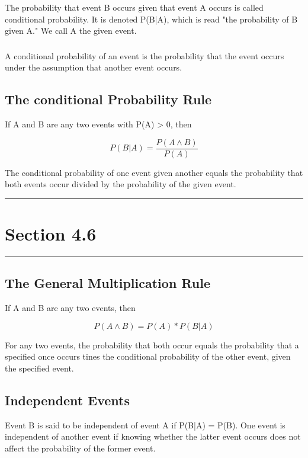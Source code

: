 \documentclass[12pt]{article}
\begin{document}
            \subsubsection*{}
                The probability that event B occurs given that event A occurs is called conditional 
                probability. It is denoted P(B|A),
                which is read "the probability of B given A." We call A the given event.
            \subsubsection*{}
                A conditional probability of an event is the probability that the event occurs under
                the assumption that another event occurs.
        \subsection*{The conditional Probability Rule}
            If A and B are any two events with P(A) > 0, then
            \begin{center}
                \[
                P(B|A) = \frac{P(A \wedge B)}{P(A)}
                \]
            \end{center}
            The conditional probability of one event given another equals the probability that both 
            events occur divided by the probability of the given event.
            
    \noindent\rule{\textwidth}{0.4pt}
    \section*{Section 4.6}
    \noindent\rule{\textwidth}{0.4pt}
        \subsection*{The General Multiplication Rule}
            If A and B are any two events, then 
            \begin{center}
                \[
                    P(A \wedge B) = P(A) * P(B|A)
                \]
            \end{center}
            For any two events, the probability that both occur equals the probability that a specified
            once occurs tines the conditional probability of the other event, given the specified event.         
        \subsection*{Independent Events}
            Event B is said to be independent of event A if P(B|A) = P(B). One event is independent of 
            another event if knowing whether the latter event occurs
            does not affect the probability of the former event.
\end{document}
